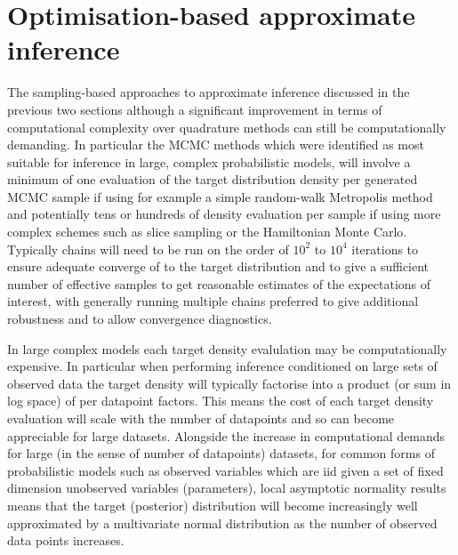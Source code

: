 \chapter{Optimisation-based approximate inference}\label{app:optimisation-based-approximate-inference}

The sampling-based approaches to approximate inference discussed in the previous two sections although a significant improvement in terms of computational complexity over quadrature methods can still be computationally demanding. In particular the \ac{MCMC} methods which were identified as most suitable for inference in large, complex probabilistic models, will involve a minimum of one evaluation of the target distribution density per generated \ac{MCMC} sample if using for example a simple random-walk Metropolis method and potentially tens or hundreds of density evaluation per sample if using more complex schemes such as slice sampling or the Hamiltonian Monte Carlo. Typically chains will need to be run on the order of $10^2$ to $10^4$ iterations to ensure adequate converge of to the target distribution and to give a sufficient number of effective samples to get reasonable estimates of the expectations of interest, with generally running multiple chains preferred to give additional robustness and to allow convergence diagnostics.

In large complex models each target density evalulation may be computationally expensive. In particular when performing inference conditioned on large sets of observed data the target density will typically factorise into a product (or sum in log space) of per datapoint factors. This means the cost of each target density evaluation will scale with the number of datapoints and so can become appreciable for large datasets. Alongside the increase in computational demands for large (in the sense of number of datapoints) datasets, for common forms of probabilistic models such as observed variables which are \ac{iid} given a set of fixed dimension unobserved variables (parameters), local asymptotic normality results means that the target (posterior) distribution will become increasingly well approximated by a multivariate normal distribution as the number of  observed data points increases. %

